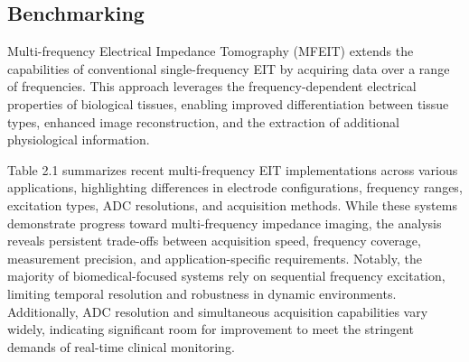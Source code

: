 \subsection{Benchmarking}
Multi-frequency Electrical Impedance Tomography (MFEIT) extends the capabilities of conventional single-frequency EIT by acquiring data over a range of frequencies. 
This approach leverages the frequency-dependent electrical properties of biological tissues, enabling improved differentiation between tissue types, enhanced image reconstruction, and the extraction of additional physiological information. 

\begin{table}[H]
\centering
\caption{ Multi-frequency EIT systems }

\label{tab:eit-comparison}
\end{table}


Table 2.1 summarizes recent multi-frequency EIT implementations across various applications, highlighting differences in electrode configurations, frequency ranges, excitation types, ADC resolutions, and acquisition methods. While these systems demonstrate progress toward multi-frequency impedance imaging, the analysis reveals persistent trade-offs between acquisition speed, frequency coverage, measurement precision, and application-specific requirements. Notably, the majority of biomedical-focused systems rely on sequential frequency excitation, limiting temporal resolution and robustness in dynamic environments. Additionally, ADC resolution and simultaneous acquisition capabilities vary widely, indicating significant room for improvement to meet the stringent demands of real-time clinical monitoring.

